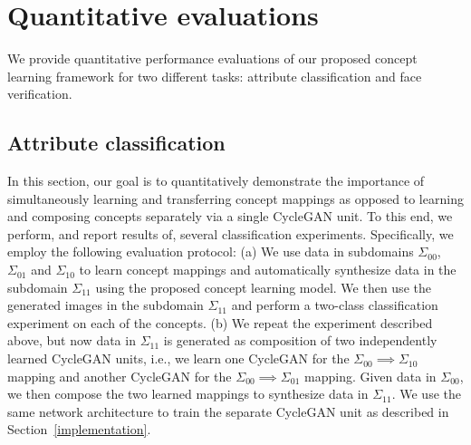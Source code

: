 \documentclass[10pt,twocolumn,letterpaper]{article}
\begin{document}

\section{Quantitative evaluations}
We provide quantitative performance evaluations of our proposed concept learning framework for two different tasks: attribute classification and face verification.

\subsection{Attribute classification}

In this section, our goal is to quantitatively demonstrate the importance of simultaneously learning and transferring concept mappings as opposed to learning and composing concepts separately via a single CycleGAN unit. To this end, we perform, and report results of, several classification experiments. Specifically, we employ the following evaluation protocol: (a) We use data in subdomains $\Sigma_{00}$, $\Sigma_{01}$ and $\Sigma_{10}$ to learn concept mappings and automatically synthesize data in the subdomain $\Sigma_{11}$ using the proposed concept learning model. We then use the generated images in the subdomain $\Sigma_{11}$ and perform a two-class classification experiment on each of the concepts. (b) We repeat the experiment described above, but now data in $\Sigma_{11}$ is generated as composition of two independently learned CycleGAN units, i.e., we learn one CycleGAN for the $\Sigma_{00}\implies \Sigma_{10} $ mapping and another CycleGAN for the $\Sigma_{00}\implies \Sigma_{01} $ mapping. Given data in $\Sigma_{00}$, we then compose the two learned mappings to synthesize data in $\Sigma_{11}$. We use the same network architecture to train the separate CycleGAN unit as described in Section~\ref{implementation}.
\end{document}
